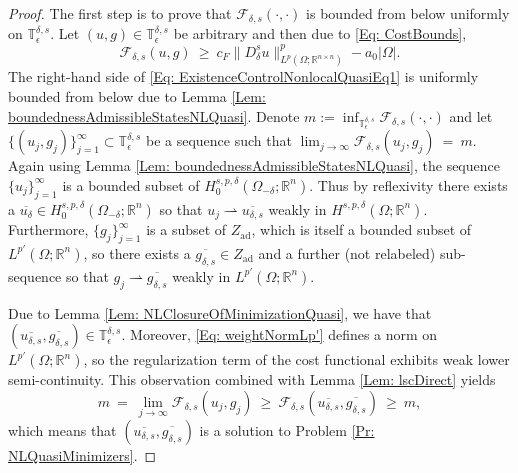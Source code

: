 \documentclass[11pt, reqno]{amsart}   	%
\theoremstyle{plain}
\numberwithin{equation}{section}
\def\de{\delta}
\def\ep{\epsilon}
\def\Om{\Omega}
\def\R{\mathbb{R}}
\begin{document}
    \begin{proof}
        The first step is to prove that $\mathcal{F}_{\de, s}(\cdot, \cdot)$ is bounded from below uniformly on $\mathbb{T}^{\de, s}_{\ep}$. Let $(u, g) \in \mathbb{T}^{\de, s}_{\ep}$ be arbitrary and then due to \eqref{Eq: CostBounds},
        \begin{equation}\label{Eq: ExistenceControlNonlocalQuasiEq1}
            \mathcal{F}_{\de, s}(u, g) \ \geq \ c_F\|D^s_{\de}u\|^p_{L^p(\Om; \R^{n \times n})} - a_0|\Om|.
        \end{equation}
        The right-hand side of \eqref{Eq: ExistenceControlNonlocalQuasiEq1} is uniformly bounded from below due to Lemma \ref{Lem: boundednessAdmissibleStatesNLQuasi}. Denote $m := \inf_{\mathbb{T}^{\de, s}_{\ep}}\mathcal{F}_{\de, s}(\cdot, \cdot)$ and let $\{(u_j, g_j)\}^{\infty}_{j = 1} \subset \mathbb{T}^{\de, s}_{\ep}$ be a sequence such that $\lim_{j \rightarrow \infty}\mathcal{F}_{\de, s}(u_j, g_j) \ = \ m$. Again using Lemma \ref{Lem: boundednessAdmissibleStatesNLQuasi}, the sequence $\{u_j\}^{\infty}_{j = 1}$ is a bounded subset of $H^{s, p, \de}_0(\Om_{-\de}; \R^n)$. Thus by reflexivity there exists a $\overline{u_{\de}} \in H^{s, p, \de}_0(\Om_{-\de}; \R^n)$ so that $u_j \rightharpoonup \overline{u_{\de, s}}$ weakly in $H^{s, p, \de}(\Om; \R^n)$. Furthermore, $\{g_j\}^{\infty}_{j = 1}$ is a subset of $Z_{\text{ad}}$, which is itself a bounded subset of $L^{p'}(\Om; \R^n)$, so there exists a $\overline{g_{\de, s}} \in Z_{\text{ad}}$ and a further (not relabeled) sub-sequence so that $g_j \rightharpoonup \overline{g_{\de, s}}$ weakly in $L^{p'}(\Om; \R^n)$. 

        Due to Lemma \ref{Lem: NLClosureOfMinimizationQuasi}, we have that $(\overline{u_{\de, s}}, \overline{g_{\de, s}}) \in \mathbb{T}^{\de, s}_{\ep}$. Moreover, \eqref{Eq: weightNormLp'} defines a norm on $L^{p'}(\Om; \R^n)$, so the regularization term of the cost functional exhibits weak lower semi-continuity. This observation combined with Lemma \ref{Lem: lscDirect} yields
        \begin{equation}\label{Eq: ExistenceControlNonlocalQuasiEq2}
            m \ = \ \lim_{j \rightarrow \infty}\mathcal{F}_{\de, s}(u_j, g_j) \ \geq \ \mathcal{F}_{\de, s}(\overline{u_{\de, s}}, \overline{g_{\de, s}}) \ \geq \ m,
        \end{equation}
        which means that $(\overline{u_{\de, s}}, \overline{g_{\de, s}})$ is a solution to Problem \ref{Pr: NLQuasiMinimizers}.
    \end{proof}
\end{document}
